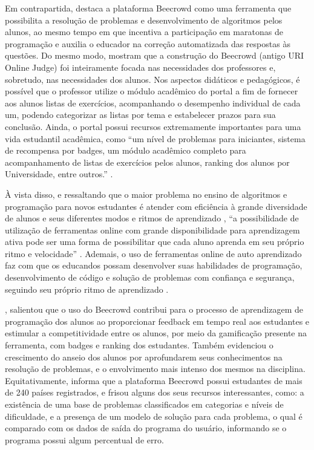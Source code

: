 Em contrapartida, \textcite[p.~5]{cruz2022} destaca a plataforma Beecrowd como uma ferramenta que possibilita a resolução de problemas e desenvolvimento de algoritmos pelos alunos, ao mesmo tempo em que incentiva a participação em maratonas de programação e auxilia o educador na correção automatizada das respostas às questões. Do mesmo modo, \textcite[p.~239]{beztonin2014} mostram que a construção do Beecrowd (antigo URI Online Judge) foi inteiramente focada nas necessidades dos professores e, sobretudo, nas necessidades dos alunos. Nos aspectos didáticos e pedagógicos, é possível que o professor utilize o módulo acadêmico do portal a fim de fornecer aos alunos listas de exercícios, acompanhando o desempenho individual de cada um, podendo categorizar as listas por tema e estabelecer prazos para sua conclusão. Ainda, o portal possui recursos extremamente importantes para uma vida estudantil acadêmica, como “um nível de  problemas  para  iniciantes,  sistema  de  recompensa  por badges,  um  módulo  acadêmico completo  para  acompanhamento  de  listas  de  exercícios  pelos  alunos,  ranking  dos  alunos  por Universidade, entre outros.” \cite[p.~239]{beztonin2014}. 

À vista disso, e ressaltando que o maior problema no ensino de algoritmos e programação para novos estudantes é atender com eficiência à grande diversidade de alunos e seus diferentes modos e ritmos de aprendizado \cite[p.~1]{beztonin2012}, “a possibilidade de utilização de ferramentas online com grande disponibilidade para aprendizagem ativa pode ser uma forma de possibilitar que cada aluno aprenda em seu próprio ritmo e velocidade” \cite[p.~5]{cruz2022}. Ademais, o uso de ferramentas online de auto aprendizado faz com que os educandos possam desenvolver suas habilidades de programação, desenvolvimento de código e solução de problemas com confiança e segurança, seguindo seu próprio ritmo de aprendizado \cite[p.~239-240]{beztonin2014}. 

\textcite[p.~248]{berssanettefrancisco}, salientou que o uso do Beecrowd contribui para o processo de aprendizagem de programação dos alunos ao proporcionar feedback em tempo real aos estudantes e estimular a competitividade entre os alunos, por meio da gamificação presente na ferramenta, com badges e ranking dos estudantes. Também evidenciou o crescimento do anseio dos alunos por aprofundarem seus conhecimentos na resolução de problemas, e o envolvimento mais intenso dos mesmos na disciplina. Equitativamente, \textcite[p.~31]{ferreira2022} informa que a plataforma Beecrowd possui estudantes de mais de 240 países registrados, e frisou alguns dos seus recursos interessantes, como: a existência de uma base de problemas classificados em categorias e níveis de dificuldade, e a presença de um modelo de solução para cada problema, o qual é comparado com os dados de saída do programa do usuário, informando se o programa possui algum percentual de erro. 

